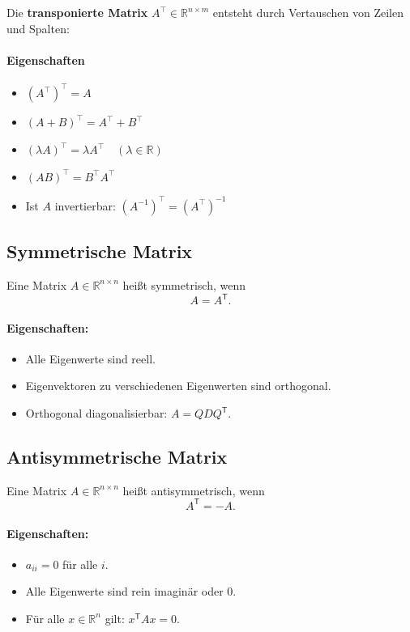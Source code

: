 \documentclass[9pt,a4paper]{article}
\begin{document}
    Die \textbf{transponierte Matrix} $A^\top \in \mathbb{R}^{n \times m}$ entsteht durch Vertauschen von Zeilen und Spalten:
    
    \paragraph*{Eigenschaften}
    \begin{itemize}
        \item $(A^\top)^\top = A$
        \item $(A + B)^\top = A^\top + B^\top$
        \item $(\lambda A)^\top = \lambda A^\top \quad (\lambda \in \mathbb{R})$
        \item $(AB)^\top = B^\top A^\top$
        \item Ist $A$ invertierbar: $(A^{-1})^\top = (A^\top)^{-1}$
    \end{itemize}
    
    \subsection*{Symmetrische Matrix}
    
    Eine Matrix $A \in \mathbb{R}^{n\times n}$ heißt symmetrisch, wenn
    \[
    A = A^{\mathsf T}.
    \]
    
    \paragraph{Eigenschaften:}
    \begin{itemize}
        \item Alle Eigenwerte sind reell.
        \item Eigenvektoren zu verschiedenen Eigenwerten sind orthogonal.
        \item Orthogonal diagonalisierbar: $A = Q D Q^{\mathsf T}$.
    \end{itemize}
    
    \subsection{Antisymmetrische Matrix}
    Eine Matrix $A \in \mathbb{R}^{n\times n}$ heißt antisymmetrisch, wenn
    \[
    A^{\mathsf T} = -A.
    \]
    
    \paragraph{Eigenschaften:}
    \begin{itemize}
        \item $a_{ii} = 0$ für alle $i$.
        \item Alle Eigenwerte sind rein imaginär oder $0$.
        \item Für alle $x \in \mathbb{R}^n$ gilt: $x^{\mathsf T} A x = 0$.
    \end{itemize}
    
\end{document}
